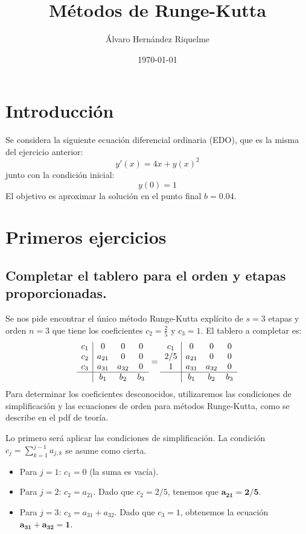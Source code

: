 \documentclass{article}
\title{Métodos de Runge-Kutta}
\author{Álvaro Hernández Riquelme}
\date{\today}
\begin{document}

\maketitle
\tableofcontents
\newpage

\section{Introducción}

Se considera la siguiente ecuación diferencial ordinaria (EDO), que es la misma del ejercicio anterior:
$$ y'(x) = 4x + y(x)^2 $$
junto con la condición inicial:
$$ y(0) = 1 $$
El objetivo es aproximar la solución en el punto final $b = 0.04$.

\section{Primeros ejercicios}
\subsection{Completar el tablero para el orden y etapas proporcionadas.}

Se nos pide encontrar el único método Runge-Kutta explícito de $s=3$ etapas y orden $n=3$ que tiene los coeficientes $c_2 = \frac{2}{5}$ y $c_3=1$. El tablero a completar es:
$$
\begin{array}{c|ccc}
c_1 & 0 & 0 & 0 \\
c_2 & a_{21} & 0 & 0 \\
c_3 & a_{31} & a_{32} & 0 \\
\hline
& b_1 & b_2 & b_3
\end{array}
=
\begin{array}{c|ccc}
c_1 & 0 & 0 & 0 \\
2/5 & a_{21} & 0 & 0 \\
1 & a_{31} & a_{32} & 0 \\
\hline
& b_1 & b_2 & b_3
\end{array}
$$
Para determinar los coeficientes desconocidos, utilizaremos las condiciones de simplificación y las ecuaciones de orden para métodos Runge-Kutta, como se describe en el pdf de teoría.

Lo primero será aplicar las condiciones de simplificación. La condición $c_j = \sum_{k=1}^{j-1} a_{j,k}$ se asume como cierta.

\begin{itemize}
    \item Para $j=1$: $c_1 = 0$ (la suma es vacía).
    \item Para $j=2$: $c_2 = a_{21}$. Dado que $c_2 = 2/5$, tenemos que $\boldsymbol{a_{21} = 2/5}$.
    \item Para $j=3$: $c_3 = a_{31} + a_{32}$. Dado que $c_3 = 1$, obtenemos la ecuación $\boldsymbol{a_{31} + a_{32} = 1}$.
\end{itemize}
\end{document}
